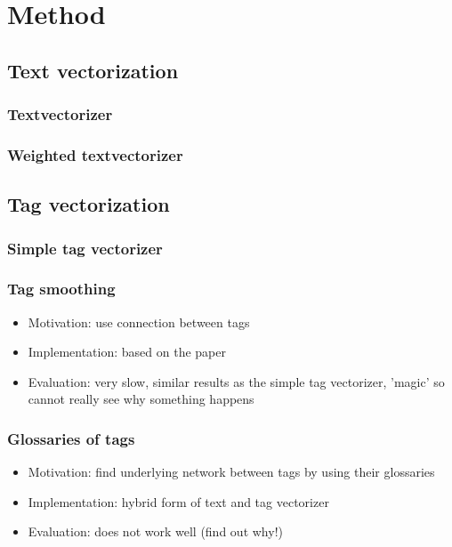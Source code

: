 \section{Method}

\subsection{Text vectorization}
\subsubsection{Textvectorizer}


\subsubsection{Weighted textvectorizer}


\subsection{Tag vectorization}
\subsubsection{Simple tag vectorizer}


\subsubsection{Tag smoothing}
\begin{itemize}
\item Motivation: use connection between tags
\item Implementation: based on the paper
\item Evaluation: very slow, similar results as the simple tag vectorizer, 'magic' so cannot really see why something happens
\end{itemize}

\subsubsection{Glossaries of tags}
\begin{itemize}
\item Motivation: find underlying network between tags by using their glossaries
\item Implementation: hybrid form of text and tag vectorizer
\item Evaluation: does not work well (find out why!) 
\end{itemize}

